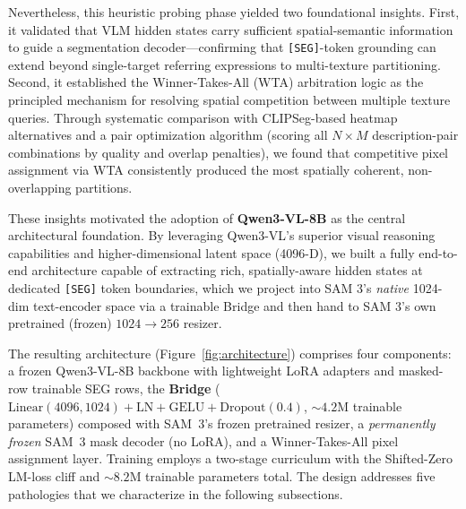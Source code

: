 \documentclass{article}
\begin{document}
Nevertheless, this heuristic probing phase yielded two foundational insights. First, it validated that VLM hidden states carry sufficient spatial-semantic information to guide a segmentation decoder---confirming that \texttt{[SEG]}-token grounding can extend beyond single-target referring expressions to multi-texture partitioning. Second, it established the Winner-Takes-All (WTA) arbitration logic as the principled mechanism for resolving spatial competition between multiple texture queries. Through systematic comparison with CLIPSeg-based heatmap alternatives and a pair optimization algorithm (scoring all $N \times M$ description-pair combinations by quality and overlap penalties), we found that competitive pixel assignment via WTA consistently produced the most spatially coherent, non-overlapping partitions.

These insights motivated the adoption of \textbf{Qwen3-VL-8B} as the central architectural foundation. By leveraging Qwen3-VL's superior visual reasoning capabilities and higher-dimensional latent space (4096-D), we built a fully end-to-end architecture capable of extracting rich, spatially-aware hidden states at dedicated \texttt{[SEG]} token boundaries, which we project into SAM 3's \emph{native} 1024-dim text-encoder space via a trainable Bridge and then hand to SAM 3's own pretrained (frozen) $1024 \to 256$ resizer.

The resulting architecture (Figure~\ref{fig:architecture}) comprises four components: a frozen Qwen3-VL-8B backbone with lightweight LoRA adapters and masked-row trainable SEG rows, the \textbf{Bridge} ($\mathrm{Linear}(4096, 1024) + \mathrm{LN} + \mathrm{GELU} + \mathrm{Dropout}(0.4)$, $\sim 4.2$M trainable parameters) composed with SAM~3's frozen pretrained resizer, a \emph{permanently frozen} SAM~3 mask decoder (no LoRA), and a Winner-Takes-All pixel assignment layer. Training employs a two-stage curriculum with the Shifted-Zero LM-loss cliff and ${\sim}8.2$M trainable parameters total. The design addresses five pathologies that we characterize in the following subsections.
\end{document}
